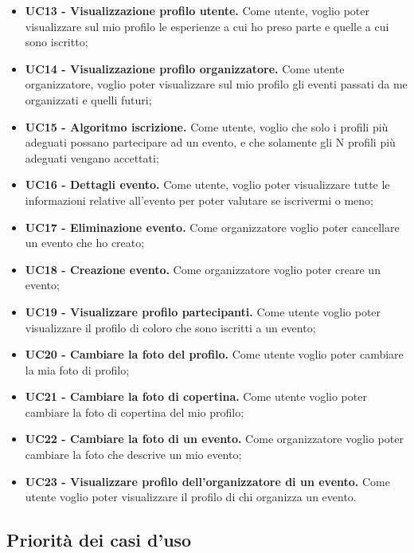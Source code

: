\begin{itemize}
    \item \textbf{UC13 - Visualizzazione profilo utente.} Come utente, voglio poter visualizzare sul mio profilo le esperienze a cui ho preso parte e quelle a cui sono iscritto;
    \item \textbf{UC14 - Visualizzazione profilo organizzatore.} Come utente organizzatore, voglio poter visualizzare sul mio profilo gli eventi passati da me organizzati e quelli futuri;
    \item \textbf{UC15 - Algoritmo iscrizione.} Come utente, voglio che solo i profili più adeguati possano partecipare ad un evento, e che solamente gli N profili più adeguati vengano accettati;
    \item \textbf{UC16 - Dettagli evento.} Come utente, voglio poter visualizzare tutte le informazioni relative all’evento per poter valutare se iscrivermi o meno;
    \item \textbf{UC17 - Eliminazione evento.} Come organizzatore voglio poter cancellare un evento che ho creato;
    \item \textbf{UC18 - Creazione evento.} Come organizzatore voglio poter creare un evento;
    \item \textbf{UC19 - Visualizzare profilo partecipanti.} Come utente voglio poter visualizzare il profilo di coloro che sono iscritti a un evento;
    \item \textbf{UC20 - Cambiare la foto del profilo.} Come utente voglio poter cambiare la mia foto di profilo;
    \item \textbf{UC21 - Cambiare la foto di copertina.} Come utente voglio poter cambiare la foto di copertina del mio profilo;
    \item \textbf{UC22 - Cambiare la foto di un evento.} Come organizzatore voglio poter cambiare la foto che descrive un mio evento;
    \item \textbf{UC23 - Visualizzare profilo dell'organizzatore di un evento.} Come utente voglio poter visualizzare il profilo di chi organizza un evento.
\end{itemize}
\clearpage

\subsection{Priorità dei casi d'uso}

